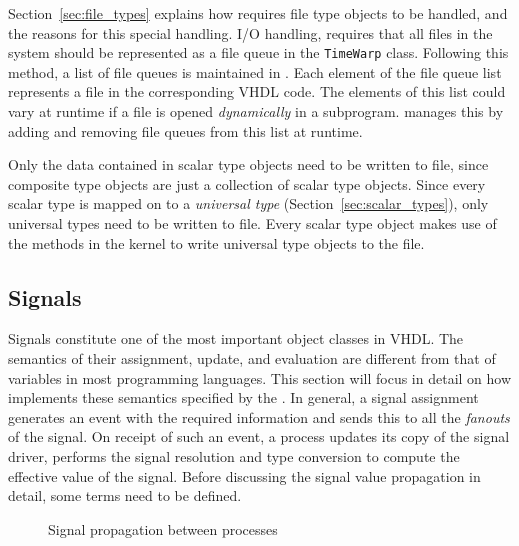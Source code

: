 \documentclass[11pt]{article}
\begin{document}
Section~\ref{sec:file_types} explains how \warped\/ requires file type
objects to be handled, and the reasons for this special handling.
\warped\/ I/O handling, requires that all files in the system should
be represented as a file queue in the \texttt{TimeWarp} class.
Following this method, a list of file queues is maintained in \tyvis.
Each element of the file queue list represents a file in the
corresponding VHDL code.  The elements of this list could vary at
runtime if a file is opened \textit{dynamically} in a subprogram.
\tyvis\/ manages this by adding and removing file queues from this
list at runtime.

Only the data contained in scalar type objects need to be written to
file, since composite type objects are just a collection of scalar
type objects.  Since every scalar type is mapped on to a
\textit{universal type} (Section~\ref{sec:scalar_types}), only
universal types need to be written to file.  Every scalar type object
makes use of the methods in the kernel to write universal type objects
to the file.

\subsection{Signals}
\label{sec:signals}

Signals  constitute one of the most important object
classes in VHDL.  The semantics of their assignment, update, and
evaluation are different from that of variables in most programming
languages.  This section will focus in detail on how \tyvis\/
implements these semantics specified by the \LRM.  In general, a
signal assignment generates an event with the required information and
sends this to all the \textit{fanouts} of the signal.  On receipt of
such an event, a process updates its copy of the signal driver,
performs the signal resolution and type conversion to compute the
effective value of the signal.  Before discussing the signal value
propagation in detail, some terms need to be defined.

\begin{figure}[htbp]
  \centerline{}
  \caption{Signal propagation between processes}
  \label{fig:sig_prop}
\end{figure}
\end{document}
